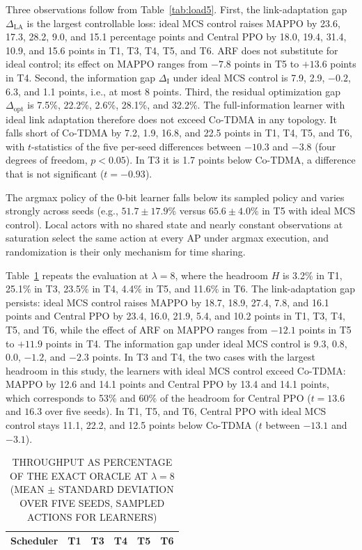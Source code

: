 \documentclass{ieeeaccess}
\begin{document}
Three observations follow from Table~\ref{tab:load5}. First, the link-adaptation gap $\Delta_{\text{LA}}$ is the largest controllable loss: ideal MCS control raises MAPPO by 23.6, 17.3, 28.2, 9.0, and 15.1 percentage points and Central PPO by 18.0, 19.4, 31.4, 10.9, and 15.6 points in T1, T3, T4, T5, and T6. ARF does not substitute for ideal control; its effect on MAPPO ranges from $-7.8$ points in T5 to $+13.6$ points in T4. Second, the information gap $\Delta_{\text{I}}$ under ideal MCS control is 7.9, 2.9, $-0.2$, 6.3, and 1.1 points, i.e., at most 8 points. Third, the residual optimization gap $\Delta_{\text{opt}}$ is 7.5\%, 22.2\%, 2.6\%, 28.1\%, and 32.2\%. The full-information learner with ideal link adaptation therefore does not exceed Co-TDMA in any topology. It falls short of Co-TDMA by 7.2, 1.9, 16.8, and 22.5 points in T1, T4, T5, and T6, with $t$-statistics of the five per-seed differences between $-10.3$ and $-3.8$ (four degrees of freedom, $p < 0.05$). In T3 it is 1.7 points below Co-TDMA, a difference that is not significant ($t = -0.93$).

The argmax policy of the 0-bit learner falls below its sampled policy and varies strongly across seeds (e.g., $51.7 \pm 17.9$\% versus $65.6 \pm 4.0$\% in T5 with ideal MCS control). Local actors with no shared state and nearly constant observations at saturation select the same action at every AP under argmax execution, and randomization is their only mechanism for time sharing.

Table~\ref{tab:load8} repeats the evaluation at $\lambda = 8$, where the headroom $H$ is 3.2\% in T1, 25.1\% in T3, 23.5\% in T4, 4.4\% in T5, and 11.6\% in T6. The link-adaptation gap persists: ideal MCS control raises MAPPO by 18.7, 18.9, 27.4, 7.8, and 16.1 points and Central PPO by 23.4, 16.0, 21.9, 5.4, and 10.2 points in T1, T3, T4, T5, and T6, while the effect of ARF on MAPPO ranges from $-12.1$ points in T5 to $+11.9$ points in T4. The information gap under ideal MCS control is 9.3, 0.8, 0.0, $-1.2$, and $-2.3$ points. In T3 and T4, the two cases with the largest headroom in this study, the learners with ideal MCS control exceed Co-TDMA: MAPPO by 12.6 and 14.1 points and Central PPO by 13.4 and 14.1 points, which corresponds to 53\% and 60\% of the headroom for Central PPO ($t = 13.6$ and $16.3$ over five seeds). In T1, T5, and T6, Central PPO with ideal MCS control stays 11.1, 22.2, and 12.5 points below Co-TDMA ($t$ between $-13.1$ and $-3.1$).

\begin{table}
\caption{THROUGHPUT AS PERCENTAGE OF THE EXACT ORACLE AT $\lambda = 8$ (MEAN $\pm$ STANDARD DEVIATION OVER FIVE SEEDS, SAMPLED ACTIONS FOR LEARNERS)}
\label{tab:load8}
\centering
\begin{tabular}{lccccc}
\toprule
Scheduler & T1 & T3 & T4 & T5 & T6 \\
\midrule

\bottomrule
\end{tabular}
\end{table}
\end{document}
